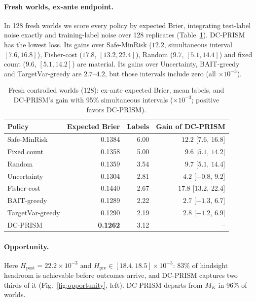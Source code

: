 \documentclass[runningheads]{llncs}
\begin{document}
\paragraph{Fresh worlds, ex-ante endpoint.} In 128 fresh worlds we score every policy by expected Brier, integrating test-label noise exactly and training-label noise over 128 replicates (Table~\ref{tab:controlled}). DC-PRISM has the lowest loss. Its gains over Safe-MinRisk ($12.2$, simultaneous interval $[7.6,16.8]$), Fisher-cost ($17.8$, $[13.2,22.4]$), Random ($9.7$, $[5.1,14.4]$) and fixed count ($9.6$, $[5.1,14.2]$) are material. Its gains over Uncertainty, BAIT-greedy and TargetVar-greedy are $2.7$--$4.2$, but those intervals include zero (all $\times10^{-3}$).

\begin{table}[t]
\caption{Fresh controlled worlds (128): ex-ante expected Brier, mean labels, and DC-PRISM's gain with 95\% simultaneous intervals ($\times10^{-3}$; positive favors DC-PRISM).}
\label{tab:controlled}
\centering\small
\begin{tabular}{lrrr}
\toprule
Policy & Expected Brier & Labels & Gain of DC-PRISM \\
\midrule
Safe-MinRisk & 0.1384 & 6.00 & $12.2$ [$7.6$, $16.8$] \\
Fixed count & 0.1358 & 5.00 & $9.6$ [$5.1$, $14.2$] \\
Random & 0.1359 & 3.54 & $9.7$ [$5.1$, $14.4$] \\
Uncertainty & 0.1304 & 2.81 & $4.2$ [$-0.8$, $9.2$] \\
Fisher-cost & 0.1440 & 2.67 & $17.8$ [$13.2$, $22.4$] \\
BAIT-greedy & 0.1289 & 2.22 & $2.7$ [$-1.3$, $6.7$] \\
TargetVar-greedy & 0.1290 & 2.19 & $2.8$ [$-1.2$, $6.9$] \\
DC-PRISM & \textbf{0.1262} & 3.12 & -- \\
\bottomrule
\end{tabular}
\end{table}

\paragraph{Opportunity.} Here $H_{\mathrm{post}}=22.2\times10^{-3}$ and $H_{\mathrm{pre}}\in[18.4,18.5]\times10^{-3}$: 83\% of hindsight headroom is achievable before outcomes arrive, and DC-PRISM captures two thirds of it (Fig.~\ref{fig:opportunity}, left). DC-PRISM departs from $M_K$ in 96\% of worlds.
\end{document}
